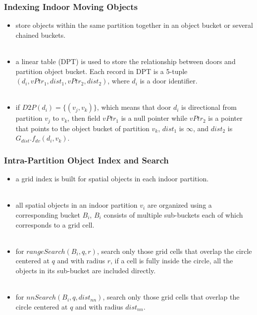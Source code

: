\begin{frame}
\frametitle{Indexing Indoor Moving Objects}

\begin{itemize}

\item store objects within the same partition together in an object bucket or several chained buckets.\\~\\

\item a linear table  (DPT) is used to store the relationship between doors and partition object bucket. Each record in DPT is a 5-tuple $(d_i, vPtr_1, dist_1, vPtr_2, dist_2)$, where $d_i$ is a door identifier.\\~\\

\item if $D2P(d_i) = \{ (v_j, v_k) \}$, which means that door $d_i$ is directional from partition $v_j$ to $v_k$, then field $vPtr_1$ is a null pointer while $vPtr_2$ is a pointer that points to the object bucket of partition $v_k$, $dist_1$ is $\infty$, and $dist_2$ is $G_{dist}.f_{dv}(d_i, v_k)$.

\end{itemize}

\end{frame}


\begin{frame}
\frametitle{Intra-Partition Object Index and Search}

\begin{itemize}

\item a grid index is built for spatial objects in each indoor partition.\\~\\

\item all spatial objects in an indoor partition $v_i$ are organized using a corresponding bucket $B_i$, $B_i$ consists of multiple sub-buckets each of which corresponds to a grid cell.\\~\\

\item for $rangeSearch(B_i,q,r)$, search only those grid cells that overlap the circle centered at $q$ and with radius $r$, if a cell is fully inside the circle, all the objects in its sub-bucket are included directly.\\~\\

\item for $nnSearch(B_i, q, dist_{nn})$, search only those grid cells that overlap the circle centered at $q$ and with radius $dist_{nn}$.

\end{itemize}

\end{frame}


